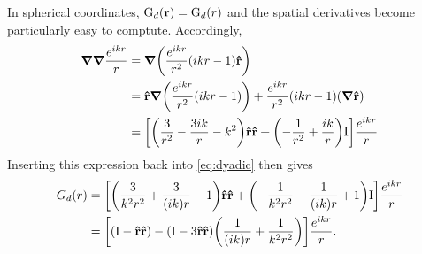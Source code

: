 In spherical coordinates, $\mathrm{G}_d(\vb{r}) = \mathrm{G}_d(r)$ and the spatial derivatives become particularly easy to comptute.
Accordingly,
\begin{equation}
  \begin{aligned}
    \grad\grad \frac{e^{ikr}}{r} &= \grad \qty(\frac{e^{ikr}}{r^2}(ikr - 1) \vu{r}) \\
    &= \vu{r}\grad \qty(\frac{e^{ikr}}{r^2}(ikr - 1)) + \frac{e^{ikr}}{r^2}(ikr - 1)\qty(\grad \vu{r}) \\
    &= \qty[\qty(\frac{3}{r^2}-\frac{3 i k}{r}-k^2) \vu{r}\vu{r} + \qty(- \frac{1}{r^2} + \frac{ik}{r}) \mathrm{I}] \frac{e^{ikr}}{r}
  \end{aligned}
\end{equation}
Inserting this expression back into \cref{eq:dyadic} then gives
\begin{equation}
  \begin{aligned}
    G_d(r) & = \qty[\qty(\frac{3}{k^2 r^2}+\frac{3}{(i k) r}-1) \vu{r}\vu{r} + \qty(-\frac{1}{k^2r^2} - \frac{1}{(ik)r} + 1) \mathrm{I}] \frac{e^{ikr}}{r} \\
    & = \qty[ \qty(\mathrm{I} - \vu{r}\vu{r}) - \qty(\mathrm{I} - 3\vu{r}\vu{r})\qty(\frac{1}{(ik)r} + \frac{1}{k^2 r^2})] \frac{e^{ikr}}{r}.
  \end{aligned}
  \label{eq:expanded dyadic}
\end{equation}


